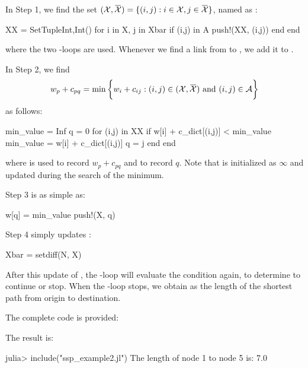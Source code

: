 In Step 1, we find the set $(\Xc,\bar{\Xc}) = \{ (i,j) : i\in\Xc, j\in\bar{\Xc} \}$, named as :
\begin{code}
XX = Set{Tuple{Int,Int}}()
for i in X, j in Xbar
	if (i,j) in A
		push!(XX, (i,j))
	end
end
\end{code}
\noindent where the two -loops are used. Whenever we find a link from  to , we add it to .

In Step 2, we find
\[
w_p + c_{pq} = \min \bigg\{ w_i + c_{ij} : (i,j)\in(\Xc,\bar{\Xc}) \text{ and } (i,j)\in\Ac \bigg\}
\]
as follows:
\begin{code}
min_value = Inf
q = 0
for (i,j) in XX
	if w[i] + c_dict[(i,j)] < min_value
		min_value = w[i] + c_dict[(i,j)]
		q = j
	end
end
\end{code}
\noindent where  is used to record $w_p + c_{pq}$ and  to record $q$. Note that  is initialized as $\infty$ and updated during the search of the minimum.

Step 3 is as simple as:
\begin{code}
w[q] = min_value
push!(X, q)
\end{code}

Step 4 simply updates :
\begin{code}
Xbar = setdiff(N, X)
\end{code}
\noindent After this update of , the -loop will evaluate the condition  again, to determine to continue or stop. When the -loop stops, we obtain  as the length of the shortest path from origin to destination.

The complete code is provided:
\begin{codelisting}
\end{codelisting}
The result is:
\begin{code}
julia> include("ssp_example2.jl")
The length of node 1 to node 5 is: 7.0
\end{code}






%
%
%
%
%
%
%
%
%
%
%
